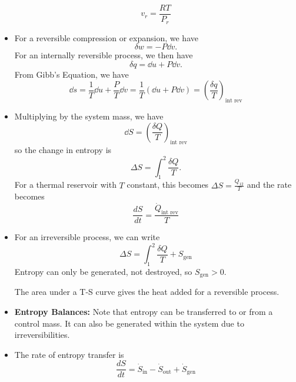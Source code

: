 \begin{itemize}
\begin{equation}
        v_r = \frac{RT}{P_r}
    \end{equation}
    \item For a reversible compression or expansion, we have 
    \begin{equation}
        \delta w = -P \dd{v}.
    \end{equation}
    For an internally reversible process, we then have 
    \begin{equation}
        \delta q = \dd{u} + P \dd{v}.
    \end{equation}
    From Gibb's Equation, we have 
    \begin{equation}
        \dd{s} = \frac{1}{T}\dd{u} + \frac{P}{T}\dd{v} = \frac{1}{T}(\dd{u}+P\dd{v}) = \left(\frac{\delta q}{T}\right)_\text{int rev}
    \end{equation}
    \item Multiplying by the system mass, we have 
    \begin{equation}
        \dd{S} = \left(\frac{\delta Q}{T}\right)_\text{int rev}
    \end{equation}
    so the change in entropy is 
    \begin{equation}
        \Delta S = \int_1^2 \frac{\delta Q}{T}.
    \end{equation}
    For a thermal reservoir with $T$ constant, this becomes $\Delta S = \frac{Q_{12}}{T}$ and the rate becomes 
    \begin{equation}
        \frac{dS}{dt} = \frac{\dot{Q}_\text{int rev}}{T}
    \end{equation}
    \item For an irreversible process, we can write 
    \begin{equation}
        \Delta S = \int_1^2 \frac{\delta Q}{T} + S_\text{gen}
    \end{equation}
    Entropy can only be generated, not destroyed, so $S_\text{gen} >0$.
    \begin{idea}
        The area under a T-S curve gives the heat added for a reversible process.
    \end{idea}
    \item \textbf{Entropy Balances:} Note that entropy can be transferred to or from a control mass. It can also be generated within the system due to irreversibilities. 
    \item The rate of entropy transfer is 
    \begin{equation}
        \frac{dS}{dt} = \dot{S}_\text{in} - \dot{S}_\text{out} + \dot{S}_\text{gen}
    \end{equation}

\end{itemize}
